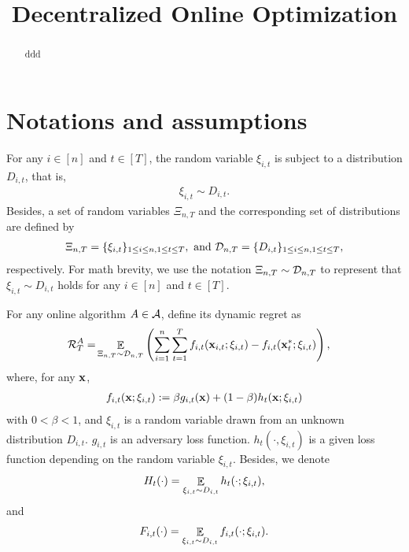 \documentclass{article}
\title{Decentralized Online Optimization}
\begin{document}
\maketitle

\begin{abstract}
ddd
\end{abstract}

\section{Notations and assumptions}

For any $i\in[n]$ and $t\in[T]$, the random variable $\xi_{i,t}$ is subject to a distribution $D_{i,t}$, that is,
\begin{align}
\nonumber
\xi_{i,t} \sim D_{i,t}.
\end{align} Besides, a set of random variables $\Xi_{n,T}$ and the corresponding set of distributions are defined by
\begin{align}
\nonumber
\Xi_{n,T} = \{ \xi_{i,t} \}_{1\le i \le n, 1 \le t \le T}, \text{~and~} \mathcal{D}_{n,T} = \{ D_{i,t} \}_{1\le i \le n, 1 \le t \le T},
\end{align} respectively. For math brevity, we use the notation $\Xi_{n,T} \sim \mathcal{D}_{n,T}$ to represent that $\xi_{i,t} \sim D_{i,t}$ holds for any $i\in[n]$ and $t\in[T]$.  





For any online algorithm $A \in {\mathcal{A}}$, define its dynamic regret as
\begin{align}
\nonumber
{\mathcal{R}}_T^{A} = & \mathop{\mathbb{E}}_{ \Xi_{n,T} \sim \mathcal{D}_{n,T} } \left(  \sum_{i=1}^n\sum_{t=1}^T f_{i,t}({\bf x}_{i,t};\xi_{i,t}) - f_{i,t}({\bf x}_t^\ast;\xi_{i,t})  \right),
\end{align} where, for any ${\bf x}$,
\begin{align}
\nonumber
f_{i,t}({\bf x};\xi_{i,t}) := \beta g_{i,t}({\bf x}) + (1-\beta) h_t({\bf x}; \xi_{i,t})
\end{align} with $0<\beta<1$, and $\xi_{i,t}$ is a random variable drawn from an unknown distribution $D_{i,t}$. $g_{i,t}$ is an adversary loss function. $h_t(\cdot, \xi_{i,t})$ is a given loss function depending on the random variable $\xi_{i,t}$. Besides, we denote 
\begin{align}
\nonumber
H_t(\cdot) = \mathop{\mathbb{E}}_{\xi_{i,t} \sim D_{i,t}} h_t(\cdot; \xi_{i,t}),
\end{align} and 
\begin{align}
\nonumber
F_{i,t}(\cdot) = \mathop{\mathbb{E}}_{\xi_{i,t} \sim D_{i,t}} f_{i,t}(\cdot; \xi_{i,t}).
\end{align}
\end{document}
